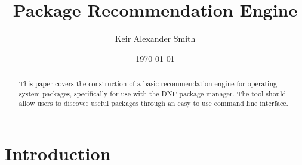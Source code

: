 \documentclass{l4proj}
\begin{document}
\title{Package Recommendation Engine}
\author{Keir Alexander Smith}
\date{\today}
\maketitle
 
\begin{abstract}
This paper covers the construction of a basic recommendation engine for operating system packages, specifically for use with the DNF package manager. The tool should allow users to discover useful packages through an easy to use command line interface.
\end{abstract}
 
\tableofcontents

\lstset{ %
language=Python,              %
basicstyle=\scriptsize,     %
numbers=left,               %
numberstyle=\scriptsize,    %
numbersep=10pt,             %
frame=trBL,                 %
captionpos=b,               %
breaklines=true,            %
breakatwhitespace=false,    %
showstringspaces=false,     %
frameround=fttt
}
 
 
\chapter{Introduction}
 
\end{document}
